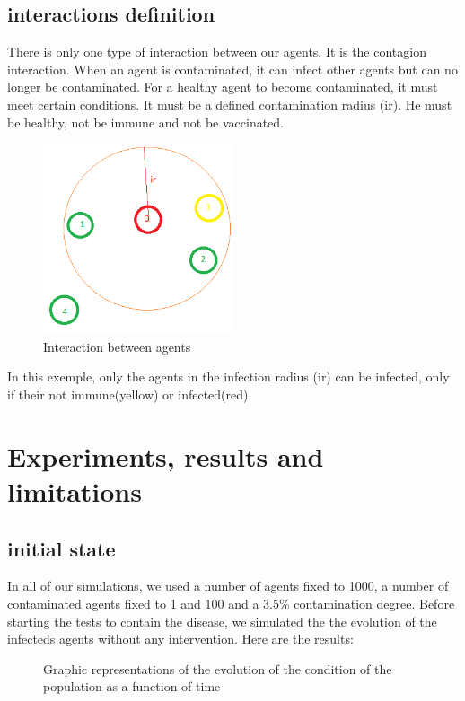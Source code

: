 \documentclass[a4paper, 12pt]{report}
\begin{document}
\subsection{interactions definition}

There is only one type of interaction between our agents. It is the contagion interaction. When an agent is contaminated, it can infect other agents but can no longer be
contaminated. For a healthy agent to become contaminated, it must meet certain conditions. It must be a defined contamination radius (ir). He must be healthy, not be immune
and not be vaccinated.

\begin{figure}[h]
	\centering
	\includegraphics[width=0.5\textwidth]{./Interactions.png}
	\caption{Interaction between agents}
\end{figure}

In this exemple, only the agents in the infection radius (ir) can be infected, only if their not immune(yellow) or infected(red).

\newpage


\section{Experiments, results and limitations}
\subsection{initial state}

In all of our simulations, we used a number of agents fixed to 1000, a number of contaminated agents fixed to 1 and 100 and a 3.5\% contamination degree.
Before starting the tests to contain the disease, we simulated the the evolution of the infecteds agents without any intervention.
Here are the results:

\begin{figure}[h]

	\centering
	\qquad
	\centering
	\caption{Graphic representations of the evolution of the condition of the population as a function of time}

\end{figure}
\end{document}
